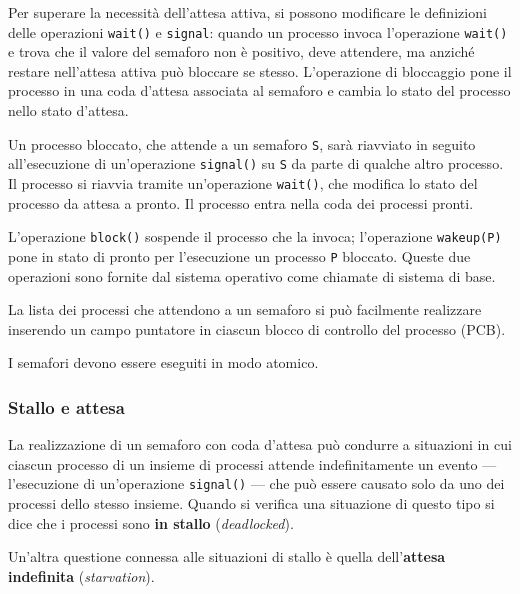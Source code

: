 \documentclass[11pt,a4paper]{article}
\begin{document}
Per superare la necessità dell'attesa attiva, si possono modificare le definizioni delle
operazioni \texttt{wait()} e \texttt{signal}: quando un processo invoca l'operazione \texttt{wait()} e trova
che il valore del semaforo non è positivo, deve attendere, ma anziché restare nell'attesa atti­va può bloccare se stesso. L'operazione di bloccaggio pone il processo in una coda d'attesa as­sociata al semaforo e cambia lo stato del processo nello stato d'attesa.

Un processo bloccato, che attende a un semaforo \texttt{S}, sarà riavviato in seguito all'esecu­zione di un'operazione \texttt{signal()} su \texttt{S} da parte di qualche altro processo. Il processo si riav­via tramite un'operazione \texttt{wait()}, che modifica lo stato del processo da attesa a pronto.
Il processo entra nella coda dei processi pronti.

L'operazione \texttt{block()} sospende il processo che la invoca; l'operazione \texttt{wakeup(P)} pone in
stato di pronto per l'esecuzione un processo \texttt{P} bloccato. Queste due operazioni sono fornite
dal sistema operativo come chiamate di sistema di base.

La lista dei processi che attendono a un semaforo si può facilmente realizzare inseren­do un campo puntatore in ciascun blocco di controllo del processo (PCB).

I semafori devono essere eseguiti in modo atomico.

\subsubsection{Stallo e attesa}
La realizzazione di un semaforo con coda d'attesa può condurre a situazioni in cui ciascun
processo di un insieme di processi attende indefinitamente un evento — l'esecuzione di
un'operazione \texttt{signal()} — che può essere causato solo da uno dei processi dello stesso in­sieme. Quando si verifica una situazione di questo tipo si dice che i processi sono \textbf{in stallo}
(\emph{deadlocked}).

Un'altra questione connessa alle situazioni di stallo è quella dell'\textbf{attesa indefinita} (\emph{starvation}).
\end{document}
